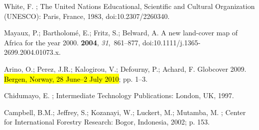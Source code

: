 \documentclass[diversity,article,accept,moreauthors,pdftex]{Definitions/mdpi}
\begin{document}


\begin{thebibliography}{999}

White, F.
; The United Nations Educational, Scientific and Cultural Organization (UNESCO): Paris, France,
   1983, doi:10.2307/2260340.

Mayaux, P.; Bartholom{\'e}, E.; Fritz, S.; Belward, A.
\newblock A new land-cover map of {Africa} for the year 2000.
 {\bf 2004}, {\em 31},~861--877, doi:10.1111/j.1365-2699.2004.01073.x.

Arino, O.; Perez, J.R.; Kalogirou, V.; Defourny, P.; Achard, F.
\newblock Globcover 2009.
 \hl{Bergen, Norway,  28 June--2 July 2010}; pp. 1--3. %

Chidumayo, E.
; Intermediate
  Technology Publications: London, UK,  1997.

Campbell, B.M.; Jeffrey, S.; Kozanayi, W.; Luckert, M.; Mutamba, M.
; Center for International Forestry Research: Bogor, Indonesia,
  2002; p. 153.


\end{thebibliography}
\end{document}
